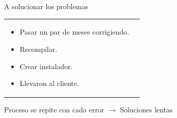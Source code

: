 \begin{frame}{A solucionar los problemas}
  \begin{tabular}{l l}
    \parbox{0.5\textwidth}{
      \begin{itemize}
        \item Pasar un par de meses corrigiendo.
        \item Recompilar.
        \item Crear instalador.
        \item Llevaron al cliente.
      \end{itemize}
    } &
     \\
  \end{tabular} \pause
  \begin{center}
    Proceso se repite con cada error \pause $\rightarrow$ Soluciones lentas
  \end{center}
\end{frame}
